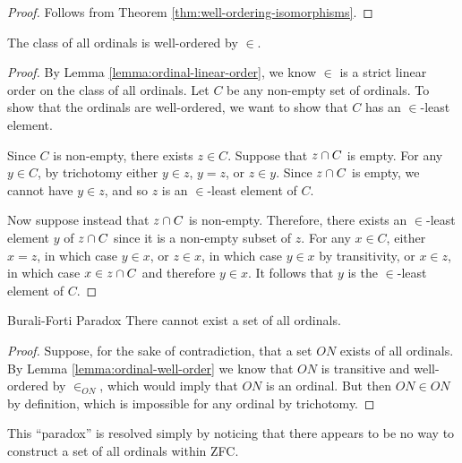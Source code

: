 \begin{proof}
    Follows from Theorem \ref{thm:well-ordering-isomorphisms}.
\end{proof}

\begin{lemma}\label{lemma:ordinal-well-order}
    The class of all ordinals is well-ordered by $\in$.
\end{lemma}

\begin{proof}
    By Lemma \ref{lemma:ordinal-linear-order}, we know $\in$ is a strict linear order on the class of all ordinals. Let $C$ be any non-empty set of ordinals. To show that the ordinals are well-ordered, we want to show that $C$ has an $\in$-least element.

    Since $C$ is non-empty, there exists $z \in C$. Suppose that $z \cap C$ is empty. For any $y \in C$, by trichotomy either $y \in z$, $y = z$, or $z \in y$. Since $z \cap C$ is empty, we cannot have $y \in z$, and so $z$ is an $\in$-least element of $C$.

    Now suppose instead that $z \cap C$ is non-empty. Therefore, there exists an $\in$-least element $y$ of $z \cap C$ since it is a non-empty subset of $z$. For any $x \in C$, either $x = z$, in which case $y \in x$, or $z \in x$, in which case $y \in x$ by transitivity, or $x \in z$, in which case $x \in z \cap C$ and therefore $y \in x$. It follows that $y$ is the $\in$-least element of $C$.
\end{proof}

\begin{thm}{Burali-Forti Paradox}\label{burali-forti}\proofbreak
    There cannot exist a set of all ordinals.
\end{thm}

\begin{proof}
    Suppose, for the sake of contradiction, that a set $ON$ exists of all ordinals. By Lemma \ref{lemma:ordinal-well-order} we know that $ON$ is transitive and well-ordered by $\in_{ON}$, which would imply that $ON$ is an ordinal. But then $ON \in ON$ by definition, which is impossible for any ordinal by trichotomy.
\end{proof}

\begin{rmk}
    This ``paradox'' is resolved simply by noticing that there appears to be no way to construct a set of all ordinals within ZFC.
\end{rmk}

